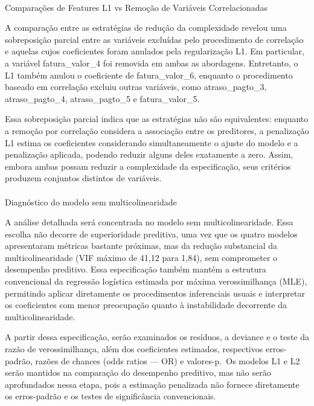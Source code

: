 \documentclass[
  brazilian,
  12pt,
  letterpaper,
  DIV=11,
  numbers=noendperiod]{scrartcl}
\makeatletter
\let\oldparagraph\paragraph
\renewcommand{\paragraph}{
    \@ifstar
      \xxxParagraphStar
      \xxxParagraphNoStar
  }
\newcommand{\xxxParagraphStar}[1]{\oldparagraph*{#1}\mbox{}}
\newcommand{\xxxParagraphNoStar}[1]{\oldparagraph{#1}\mbox{}}
\makeatother
\begin{document}
\paragraph{Comparações de Features L1 vs Remoção de Variáveis
Correlacionadas}\label{comparauxe7uxf5es-de-features-l1-vs-remouxe7uxe3o-de-variuxe1veis-correlacionadas}

A comparação entre as estratégias de redução da complexidade revelou uma
sobreposição parcial entre as variáveis excluídas pelo procedimento de
correlação e aquelas cujos coeficientes foram anulados pela
regularização L1. Em particular, a variável fatura\_valor\_4 foi
removida em ambas as abordagens. Entretanto, o L1 também anulou o
coeficiente de fatura\_valor\_6, enquanto o procedimento baseado em
correlação excluiu outras variáveis, como atraso\_pagto\_3,
atraso\_pagto\_4, atraso\_pagto\_5 e fatura\_valor\_5.

Essa sobreposição parcial indica que as estratégias não são
equivalentes: enquanto a remoção por correlação considera a associação
entre os preditores, a penalização L1 estima os coeficientes
considerando simultaneamente o ajuste do modelo e a penalização
aplicada, podendo reduzir alguns deles exatamente a zero. Assim, embora
ambas possam reduzir a complexidade da especificação, seus critérios
produzem conjuntos distintos de variáveis.

\paragraph{Diagnóstico do modelo sem
multicolinearidade}\label{diagnuxf3stico-do-modelo-sem-multicolinearidade}

A análise detalhada será concentrada no modelo sem multicolinearidade.
Essa escolha não decorre de superioridade preditiva, uma vez que os
quatro modelos apresentaram métricas bastante próximas, mas da redução
substancial da multicolinearidade (VIF máximo de 41,12 para 1,84), sem
comprometer o desempenho preditivo. Essa especificação também mantém a
estrutura convencional da regressão logística estimada por máxima
verossimilhança (MLE), permitindo aplicar diretamente os procedimentos
inferenciais usuais e interpretar os coeficientes com menor preocupação
quanto à instabilidade decorrente da multicolinearidade.

A partir dessa especificação, serão examinados os resíduos, a deviance e
o teste da razão de verossimilhança, além dos coeficientes estimados,
respectivos erros-padrão, razões de chances (odds ratios --- OR) e
valores-p.~Os modelos L1 e L2 serão mantidos na comparação do desempenho
preditivo, mas não serão aprofundados nessa etapa, pois a estimação
penalizada não fornece diretamente os erros-padrão e os testes de
significância convencionais.
\end{document}
